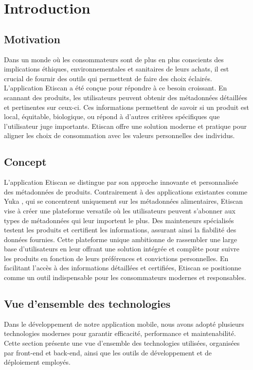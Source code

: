 \section{Introduction}

\subsection{Motivation}

Dans un monde où les consommateurs sont de plus en plus conscients des implications éthiques, environnementales et sanitaires de leurs achats, il est crucial de fournir des outils qui permettent de faire des choix éclairés. L'application Etiscan a été conçue pour répondre à ce besoin croissant. En scannant des produits, les utilisateurs peuvent obtenir des métadonnées détaillées et pertinentes sur ceux-ci. Ces informations permettent de savoir si un produit est local, équitable, biologique, ou répond à d'autres critères spécifiques que l'utilisateur juge importants. Etiscan offre une solution moderne et pratique pour aligner les choix de consommation avec les valeurs personnelles des individus.

\subsection{Concept}

L'application Etiscan se distingue par son approche innovante et personnalisée des métadonnées de produits. Contrairement à des applications existantes comme Yuka \cite{yuka}, qui se concentrent uniquement sur les métadonnées alimentaires, Etiscan vise à créer une plateforme versatile où les utilisateurs peuvent s'abonner aux types de métadonnées qui leur importent le plus. Des mainteneurs spécialisés testent les produits et certifient les informations, assurant ainsi la fiabilité des données fournies. Cette plateforme unique ambitionne de rassembler une large base d'utilisateurs en leur offrant une solution intégrée et complète pour suivre les produits en fonction de leurs préférences et convictions personnelles. En facilitant l'accès à des informations détaillées et certifiées, Etiscan se positionne comme un outil indispensable pour les consommateurs modernes et responsables.


\subsection{Vue d'ensemble des technologies}

Dans le développement de notre application mobile, nous avons adopté plusieurs technologies modernes pour garantir efficacité, performance et maintenabilité. Cette section présente une vue d'ensemble des technologies utilisées, organisées par front-end et back-end, ainsi que les outils de développement et de déploiement employés.

